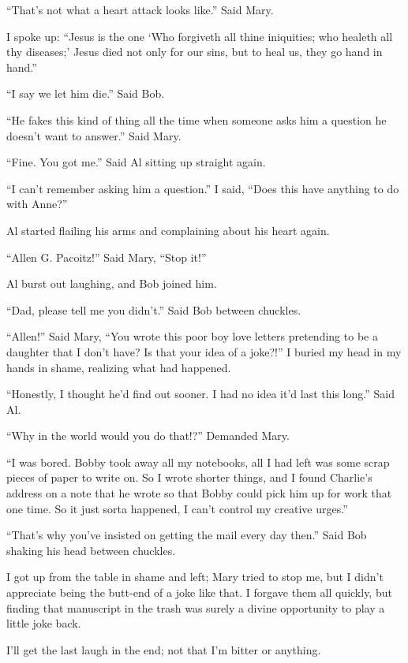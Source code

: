 ``That's not what a heart attack looks like.'' Said Mary.

I spoke up: ``Jesus is the one `Who forgiveth all thine iniquities; who healeth all thy diseases;' Jesus died not only for our sins, but to heal us, they go hand in hand.''

``I say we let him die.'' Said Bob.

``He fakes this kind of thing all the time when someone asks him a question he doesn't want to answer.'' Said Mary.

``Fine. You got me.'' Said Al sitting up straight again.

``I can't remember asking him a question.'' I said, ``Does this have anything to do with Anne?''

Al started flailing his arms and complaining about his heart again.

``Allen G. Pacoitz!'' Said Mary, ``Stop it!''

Al burst out laughing, and Bob joined him.

``Dad, please tell me you didn't.'' Said Bob between chuckles.

``Allen!'' Said Mary, ``You wrote this poor boy love letters pretending to be a daughter that I don't have? Is that your idea of a joke?!''
 I buried my head in my hands in shame, realizing what had happened.

``Honestly, I thought he'd find out sooner. I had no idea it'd last this long.'' Said Al.

``Why in the world would you do that!?'' Demanded Mary.

``I was bored. Bobby took away all my notebooks, all I had left was some scrap pieces of paper to write on. So I wrote shorter things, and I found Charlie's address on a note that he wrote so that Bobby could pick him up for work that one time. So it just sorta happened, I can't control my creative urges.''

``That's why you've insisted on getting the mail every day then.'' Said Bob shaking his head between chuckles.

I got up from the table in shame and left; Mary tried to stop me, but I didn't appreciate being the butt-end of a joke like that. I forgave them all quickly, but finding that manuscript in the trash was surely a divine opportunity to play a little joke back.

I'll get the last laugh in the end; not that I'm bitter or anything.
